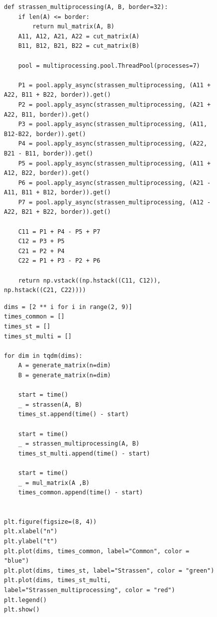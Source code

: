\documentclass[a4paper, 14pt]{extarticle}
\begin{document}
\begin{figure}[H]
\begin{lstlisting}[language={},caption={Реализация метода Штрассена с многопоточностью},label={lst:code2}]
def strassen_multiprocessing(A, B, border=32):
    if len(A) <= border:
        return mul_matrix(A, B)
    A11, A12, A21, A22 = cut_matrix(A)
    B11, B12, B21, B22 = cut_matrix(B)

    pool = multiprocessing.pool.ThreadPool(processes=7)

    P1 = pool.apply_async(strassen_multiprocessing, (A11 + A22, B11 + B22, border)).get()
    P2 = pool.apply_async(strassen_multiprocessing, (A21 + A22, B11, border)).get()
    P3 = pool.apply_async(strassen_multiprocessing, (A11, B12-B22, border)).get()
    P4 = pool.apply_async(strassen_multiprocessing, (A22, B21 - B11, border)).get()
    P5 = pool.apply_async(strassen_multiprocessing, (A11 + A12, B22, border)).get()
    P6 = pool.apply_async(strassen_multiprocessing, (A21 - A11, B11 + B12, border)).get()
    P7 = pool.apply_async(strassen_multiprocessing, (A12 - A22, B21 + B22, border)).get()

    C11 = P1 + P4 - P5 + P7
    C12 = P3 + P5
    C21 = P2 + P4
    C22 = P1 + P3 - P2 + P6

    return np.vstack((np.hstack((C11, C12)), np.hstack((C21, C22))))
\end{lstlisting}
\end{figure}


\begin{figure}[H]
\begin{lstlisting}[language={},caption={Построение графика},label={lst:code2}]
dims = [2 ** i for i in range(2, 9)]
times_common = []
times_st = []
times_st_multi = []

for dim in tqdm(dims):
    A = generate_matrix(n=dim)
    B = generate_matrix(n=dim)

    start = time()
    _ = strassen(A, B)
    times_st.append(time() - start)

    start = time()
    _ = strassen_multiprocessing(A, B)
    times_st_multi.append(time() - start)

    start = time()
    _ = mul_matrix(A ,B)
    times_common.append(time() - start)


plt.figure(figsize=(8, 4))
plt.xlabel("n")
plt.ylabel("t")
plt.plot(dims, times_common, label="Common", color = "blue")
plt.plot(dims, times_st, label="Strassen", color = "green")
plt.plot(dims, times_st_multi, label="Strassen_multiprocessing", color = "red")
plt.legend()
plt.show()
\end{lstlisting}
\end{figure}
\end{document}
